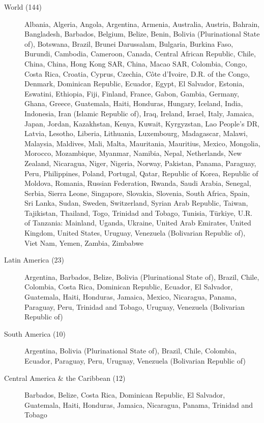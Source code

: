 \begin{description}
\item[World (144)] Albania, Algeria, Angola, Argentina, Armenia, Australia, Austria, Bahrain, Bangladesh, Barbados, Belgium, Belize, Benin, Bolivia (Plurinational State of), Botswana, Brazil, Brunei Darussalam, Bulgaria, Burkina Faso, Burundi, Cambodia, Cameroon, Canada, Central African Republic, Chile, China, China, Hong Kong SAR, China, Macao SAR, Colombia, Congo, Costa Rica, Croatia, Cyprus, Czechia, Côte d'Ivoire, D.R. of the Congo, Denmark, Dominican Republic, Ecuador, Egypt, El Salvador, Estonia, Eswatini, Ethiopia, Fiji, Finland, France, Gabon, Gambia, Germany, Ghana, Greece, Guatemala, Haiti, Honduras, Hungary, Iceland, India, Indonesia, Iran (Islamic Republic of), Iraq, Ireland, Israel, Italy, Jamaica, Japan, Jordan, Kazakhstan, Kenya, Kuwait, Kyrgyzstan, Lao People's DR, Latvia, Lesotho, Liberia, Lithuania, Luxembourg, Madagascar, Malawi, Malaysia, Maldives, Mali, Malta, Mauritania, Mauritius, Mexico, Mongolia, Morocco, Mozambique, Myanmar, Namibia, Nepal, Netherlands, New Zealand, Nicaragua, Niger, Nigeria, Norway, Pakistan, Panama, Paraguay, Peru, Philippines, Poland, Portugal, Qatar, Republic of Korea, Republic of Moldova, Romania, Russian Federation, Rwanda, Saudi Arabia, Senegal, Serbia, Sierra Leone, Singapore, Slovakia, Slovenia, South Africa, Spain, Sri Lanka, Sudan, Sweden, Switzerland, Syrian Arab Republic, Taiwan, Tajikistan, Thailand, Togo, Trinidad and Tobago, Tunisia, Türkiye, U.R. of Tanzania: Mainland, Uganda, Ukraine, United Arab Emirates, United Kingdom, United States, Uruguay, Venezuela (Bolivarian Republic of), Viet Nam, Yemen, Zambia, Zimbabwe
\item[Latin America (23)] Argentina, Barbados, Belize, Bolivia (Plurinational State of), Brazil, Chile, Colombia, Costa Rica, Dominican Republic, Ecuador, El Salvador, Guatemala, Haiti, Honduras, Jamaica, Mexico, Nicaragua, Panama, Paraguay, Peru, Trinidad and Tobago, Uruguay, Venezuela (Bolivarian Republic of)
\item[South America (10)] Argentina, Bolivia (Plurinational State of), Brazil, Chile, Colombia, Ecuador, Paraguay, Peru, Uruguay, Venezuela (Bolivarian Republic of)
\item[Central America \& the Caribbean (12)] Barbados, Belize, Costa Rica, Dominican Republic, El Salvador, Guatemala, Haiti, Honduras, Jamaica, Nicaragua, Panama, Trinidad and Tobago
\end{description}
